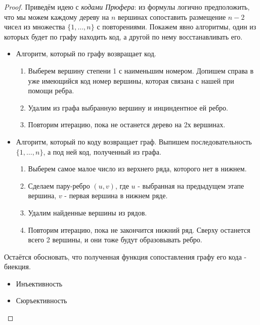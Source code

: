 \begin{proof}
	Приведём идею с \textit{кодами Прюфера}: из формулы логично предположить, что мы можем каждому дереву на $n$ вершинах сопоставить размещение $n - 2$ чисел из множества $\{1, \ldots, n\}$ с повторениями. Покажем явно алгоритмы, один из которых будет по графу находить код, а другой по нему восстанавливать его.
	\begin{itemize}
		\item Алгоритм, который по графу возвращает код.
		\begin{enumerate}
			\item Выберем вершину степени 1 с наименьшим номером. Допишем справа в уже имеющийся код номер вершины, которая связана с нашей при помощи ребра.
			
			\item Удалим из графа выбранную вершину и инциндентное ей ребро.
			
			\item Повторим итерацию, пока не останется дерево на 2х вершинах.
		\end{enumerate}
		
		\item Алгоритм, который по коду возвращает граф.
		Выпишем последовательность $\{1, \ldots, n\}$, а под ней код, полученный из графа.
		\begin{enumerate}
			\item Выберем самое малое число из верхнего ряда, которого нет в нижнем.
			
			\item Сделаем пару-ребро $(u, v)$, где $u$ - выбранная на предыдущем этапе вершина, $v$ - первая вершина в нижнем ряде.
			
			\item Удалим найденные вершины из рядов.
			
			\item Повторим итерацию, пока не закончится нижний ряд. Сверху останется всего 2 вершины, и они тоже будут образовывать ребро.
		\end{enumerate}
	\end{itemize}

	Остаётся обосновать, что полученная функция сопоставления графу его кода - биекция.
	\begin{itemize}
		\item Инъективность
		
		\item Сюръективность
	\end{itemize}
\end{proof}

